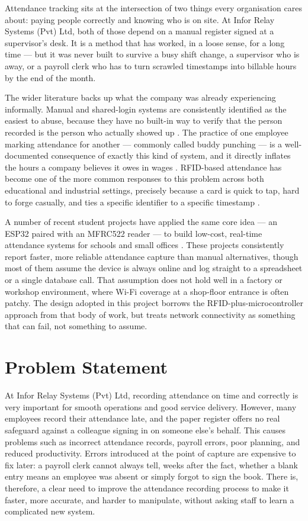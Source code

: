 Attendance tracking sits at the intersection of two things every organisation cares about: paying people correctly and knowing who is on site. At Infor Relay Systems (Pvt) Ltd, both of those depend on a manual register signed at a supervisor's desk. It is a method that has worked, in a loose sense, for a long time — but it was never built to survive a busy shift change, a supervisor who is away, or a payroll clerk who has to turn scrawled timestamps into billable hours by the end of the month.

The wider literature backs up what the company was already experiencing informally. Manual and shared-login systems are consistently identified as the easiest to abuse, because they have no built-in way to verify that the person recorded is the person who actually showed up \parencite{oloid2025buddy}. The practice of one employee marking attendance for another — commonly called buddy punching — is a well-documented consequence of exactly this kind of system, and it directly inflates the hours a company believes it owes in wages \parencite{qandle2025buddy}. RFID-based attendance has become one of the more common responses to this problem across both educational and industrial settings, precisely because a card is quick to tap, hard to forge casually, and ties a specific identifier to a specific timestamp \parencite{want2006introduction, landt2005history}.

A number of recent student projects have applied the same core idea — an ESP32 paired with an MFRC522 reader — to build low-cost, real-time attendance systems for schools and small offices \parencite{singh2022iot, yadav2025rfid, hutabarat2025implementation}. These projects consistently report faster, more reliable attendance capture than manual alternatives, though most of them assume the device is always online and log straight to a spreadsheet or a single database call. That assumption does not hold well in a factory or workshop environment, where Wi-Fi coverage at a shop-floor entrance is often patchy. The design adopted in this project borrows the RFID-plus-microcontroller approach from that body of work, but treats network connectivity as something that can fail, not something to assume.

\section{Problem Statement}

At Infor Relay Systems (Pvt) Ltd, recording attendance on time and correctly is very important for smooth operations and good service delivery. However, many employees record their attendance late, and the paper register offers no real safeguard against a colleague signing in on someone else's behalf. This causes problems such as incorrect attendance records, payroll errors, poor planning, and reduced productivity. Errors introduced at the point of capture are expensive to fix later: a payroll clerk cannot always tell, weeks after the fact, whether a blank entry means an employee was absent or simply forgot to sign the book. There is, therefore, a clear need to improve the attendance recording process to make it faster, more accurate, and harder to manipulate, without asking staff to learn a complicated new system.

